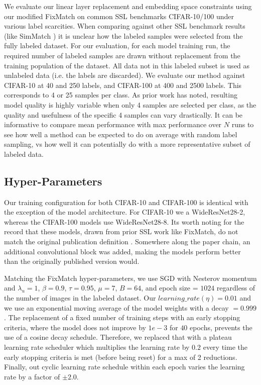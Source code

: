 \documentclass[10pt,twocolumn,letterpaper]{article}
\begin{document}
We evaluate our linear layer replacement and embedding space constraints using our modified FixMatch on common SSL benchmarks CIFAR-10/100 \cite{cifar10} under various label scarcities. 
When comparing against other SSL benchmark results (like SimMatch \cite{zheng2022simmatch}) it is unclear how the labeled samples were selected from the fully labeled dataset. 
For our evaluation, for each model training run, the required number of labeled samples are drawn without replacement from the training population of the dataset.
All data not in this labeled subset is used as unlabeled data (i.e. the labels are discarded).
We evaluate our method against CIFAR-10 at 40 and 250 labels, and CIFAR-100 at 400 and 2500 labels. 
This corresponds to 4 or 25 samples per class.
As prior work \cite{sohn2020fixmatch} has noted, resulting model quality is highly variable when only 4 samples are selected per class, as the quality and usefulness of the specific 4 samples can vary drastically. 
It can be informative to compare mean performance with max performance over $N$ runs to see how well a method can be expected to do on average with random label sampling, vs how well it can potentially do with a more representative subset of labeled data.

\subsection{Hyper-Parameters}

Our training configuration for both CIFAR-10 and CIFAR-100 is identical with the exception of the model architecture.
For CIFAR-10 we a WideResNet28-2, whereas the CIFAR-100 models use WideResNet28-8.
Its worth noting for the record that these models, drawn from prior SSL work like FixMatch, do not match the original publication definition \cite{zagoruyko2016wide}.
Somewhere along the paper chain, an additional convolutional block was added, making the models perform better than the originally published version would.

Matching the FixMatch \cite{sohn2020fixmatch} hyper-parameters, we use SGD with Nesterov momentum and $\lambda_u = 1$, $\beta = 0.9$, $\tau = 0.95$, $\mu = 7$, $B = 64$, and epoch size = $1024$ regardless of the number of images in the labeled dataset.
Our $learning\_rate (\eta) = 0.01$ and we use an exponential moving average of the model weights with a decay $=0.999$.
The replacement of a fixed number of training steps with an early stopping criteria, where the model does not improve by $1e-3$ for $40$ epochs, prevents the use of a cosine decay schedule.
Therefore, we replaced that with a plateau learning rate scheduler which multiplies the learning rate by $0.2$ every time the early stopping criteria is met (before being reset) for a max of 2 reductions.
Finally, out cyclic learning rate schedule within each epoch varies the learning rate by a factor of $\pm2.0$.
\end{document}
